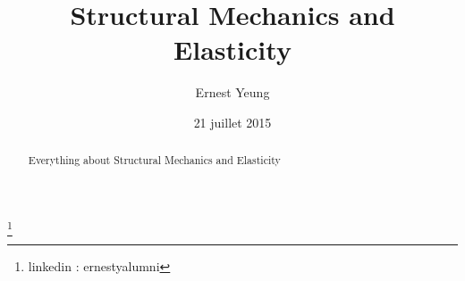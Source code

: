 \documentclass[twoside,landscape,10pt]{amsart}
\theoremstyle{plain}
\theoremstyle{definition}
\theoremstyle{remark}
\begin{document}
\lstset{language=Python} %

\title[Structural Mechanics and Elasticity]{Structural Mechanics and Elasticity}
\author{Ernest Yeung}
\address{}
\thanks{linkedin : ernestyalumni }




\date{21 juillet 2015}
\begin{abstract}
Everything about Structural Mechanics and Elasticity
\end{abstract}

\maketitle


\setcounter{tocdepth}{1}
\tableofcontents
\end{document}
